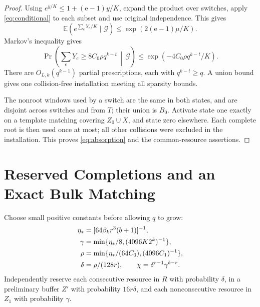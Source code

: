 \documentclass[12pt,letterpaper,onecolumn]{article}
\theoremstyle{definition}
\newcommand{\E}{\mathbb E}
\newcommand{\cG}{\mathcal G}
\begin{document}
\begin{proof}
Using $e^{y/K}\le1+(\mathrm e-1)y/K$, expand the product over switches, apply \eqref{eq:conditional} to each subset and use original independence. This gives
\[
 \E(e^{\sum_eY_e/K}\mid\cG)\le
 \exp(2(\mathrm e-1)\mu/K).
\]
Markov's inequality gives
\[
\Pr\left(\sum_eY_e\ge8C_0\rho q^{k-t}\,\middle|\,\cG\right)
\le \exp(-4C_0\rho q^{k-t}/K).
\]
There are $O_{L,k}(q^{k-1})$ partial prescriptions, each with $q^{k-t}\ge q$. A union bound gives one collision-free installation meeting all sparsity bounds.

The nonroot windows used by a switch are the same in both states, and are disjoint across switches and from $T$; their union is $B_0$. Activate state one exactly on a template matching covering $Z_0\cup X$, and state zero elsewhere. Each complete root is then used once at most; all other collisions were excluded in the installation. This proves \eqref{eq:absorption} and the common-resource assertions.
\end{proof}

\section{Reserved Completions and an Exact Bulk Matching}
Choose small positive constants before allowing $q$ to grow:
\begin{align}
 \eta_*&=[64\beta_k r^3(b+1)]^{-1},\notag\\
 \gamma&=\min\{\eta_*/8,(4096K2^k)^{-1}\},\notag\\
 \rho&=\min\{\eta_*/(64C_0),(4096C_1)^{-1}\},\notag\\
 \delta&=\rho/(128r),\qquad\chi=\delta^{r-1}\gamma^{b-r}.
 \label{eq:constants}
\end{align}
Independently reserve each consecutive resource in $R$ with probability $\delta$, in a preliminary buffer $Z'$ with probability $16r\delta$, and each nonconsecutive resource in $Z_1$ with probability $\gamma$.
\end{document}
